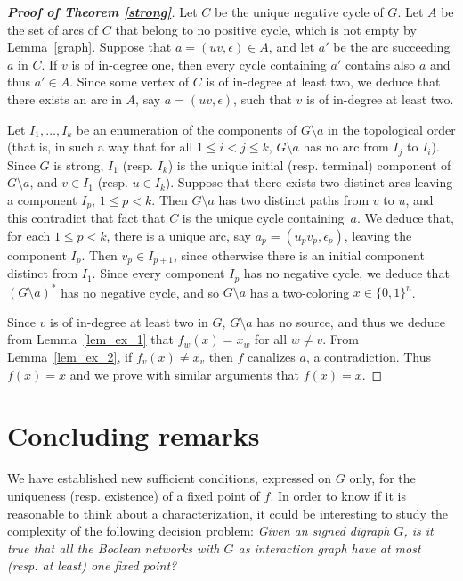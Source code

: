\documentclass[11pt,a4paper]{article}
\def\B{\{0,1\}}
\def\e{\epsilon}
\begin{document}
\begin{proof}[{\bf Proof of Theorem \ref{strong}}]
Let $C$ be the unique negative cycle of $G$. Let $A$ be the set of arcs of $C$ that belong to no positive cycle, which is not empty by Lemma~\ref{graph}. Suppose that $a=(uv,\e)\in A$, and let $a'$ be the arc succeeding $a$ in $C$. If $v$ is of in-degree one, then every cycle containing $a'$ contains also $a$ and thus $a'\in A$. Since some vertex of $C$ is of in-degree at least two, we deduce that there exists an arc in $A$, say $a=(uv,\e)$,  such that $v$ is of in-degree at least two. 

\medskip
Let $I_1,\dots,I_k$ be an enumeration of the components of $G\setminus a$ in the topological order (that is, in such a way that for all $1\leq i<j\leq k$, $G\setminus a$ has no arc from $I_j$ to $I_i$). Since $G$ is strong, $I_1$ (resp. $I_k$) is the unique initial (resp. terminal) component of $G\setminus a$, and $v\in I_1$ (resp. $u\in I_k$). Suppose that there exists two distinct arcs leaving a component $I_p$, $1\leq p<k$. Then $G\setminus a$ has two distinct paths from $v$ to $u$, and this contradict that fact that $C$ is the unique cycle containing~$a$. We deduce that, for each $1\leq p<k$, there is a unique arc, say $a_p=(u_pv_p,\e_p)$, leaving the component $I_p$. Then $v_p\in I_{p+1}$, since otherwise there is an initial component distinct from $I_1$. Since every component $I_p$ has no negative cycle, we deduce that $(G\setminus a)^*$ has no negative cycle, and so $G\setminus a$ has a two-coloring $x\in\B^n$. 

\medskip
Since $v$ is of in-degree at least two in $G$, $G\setminus a$ has no source, and thus we deduce from Lemma~\ref{lem_ex_1} that $f_w(x)=x_w$ for all $w\neq v$. From Lemma~\ref{lem_ex_2}, if $f_v(x)\neq x_v$ then $f$ canalizes $a$, a contradiction. Thus $f(x)=x$ and we prove with similar arguments that $f(\overline{x})=\overline{x}$. 
\end{proof}

\section{Concluding remarks}\label{sec:conclusion}


We have established new sufficient conditions, expressed on $G$ only, for the uniqueness (resp. existence) of a fixed point of $f$. In order to know if it is reasonable to think about a characterization, it could be interesting to study the complexity of the following decision problem: {\em Given an signed digraph $G$, is it true that all the Boolean networks with $G$ as interaction graph have at most (resp. at least) one fixed point?}
\end{document}
